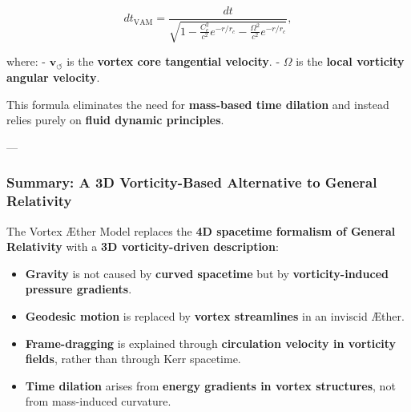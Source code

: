 \begin{equation*}
    dt_\text{VAM} = \frac{dt}{\sqrt{1 - \frac{C_e^2}{c^2} e^{-r/r_c} - \frac{\Omega^2}{c^2} e^{-r/r_c}}},
\end{equation*}

where:
- \( \mathbf{v}_{\scriptscriptstyle\boldsymbol{\circlearrowleft}} \) is the \textbf{vortex core tangential velocity}.
- \( \Omega \) is the \textbf{local vorticity angular velocity}.

This formula eliminates the need for \textbf{mass-based time dilation} and instead relies purely on \textbf{fluid dynamic principles}.

---

\subsubsection*{Summary: A 3D Vorticity-Based Alternative to General Relativity}

The Vortex Æther Model replaces the \textbf{4D spacetime formalism of General Relativity} with a \textbf{3D vorticity-driven description}:

\begin{itemize}
    \item \textbf{Gravity} is not caused by \textbf{curved spacetime} but by \textbf{vorticity-induced pressure gradients}.
    \item \textbf{Geodesic motion} is replaced by \textbf{vortex streamlines} in an inviscid Æther.
    \item \textbf{Frame-dragging} is explained through \textbf{circulation velocity in vorticity fields}, rather than through Kerr spacetime.
    \item \textbf{Time dilation} arises from \textbf{energy gradients in vortex structures}, not from mass-induced curvature.
\end{itemize}